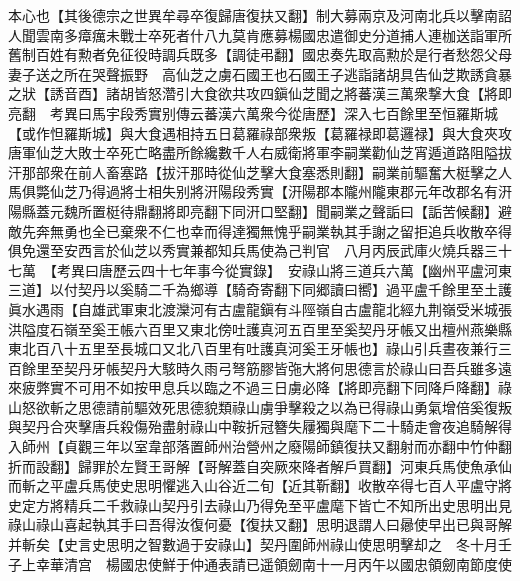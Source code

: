 本心也【其後德宗之世異牟尋卒復歸唐復扶又翻】制大募兩京及河南北兵以擊南詔人聞雲南多瘴癘未戰士卒死者什八九莫肯應募楊國忠遣御史分道捕人連枷送詣軍所舊制百姓有勲者免征役時調兵既多【調徒弔翻】國忠奏先取高勲於是行者愁怨父母妻子送之所在哭聲振野　高仙芝之虜石國王也石國王子逃詣諸胡具告仙芝欺誘貪暴之狀【誘音酉】諸胡皆怒濳引大食欲共攻四鎭仙芝聞之將蕃漢三萬衆撃大食【將即亮翻　考異曰馬宇段秀實别傳云蕃漢六萬衆今從唐歷】深入七百餘里至恒羅斯城【或作怛羅斯城】與大食遇相持五日葛羅祿部衆叛【葛羅禄即葛邏禄】與大食夾攻唐軍仙芝大敗士卒死亡略盡所餘纔數千人右威衛將軍李嗣業勸仙芝宵遁道路阻隘拔汗那部衆在前人畜塞路【拔汗那時從仙芝擊大食塞悉則翻】嗣業前驅奮大梃擊之人馬俱斃仙芝乃得過將士相失别將汧陽段秀實【汧陽郡本隴州隴東郡元年改郡名有汧陽縣蓋元魏所置梃待鼎翻將即亮翻下同汧口堅翻】聞嗣業之聲詬曰【詬苦候翻】避敵先奔無勇也全已棄衆不仁也幸而得達獨無愧乎嗣業執其手謝之留拒追兵收散卒得俱免還至安西言於仙芝以秀實兼都知兵馬使為己判官　八月丙辰武庫火燒兵器三十七萬　【考異曰唐歷云四十七年事今從實錄】　安祿山將三道兵六萬【幽州平盧河東三道】以付契丹以奚騎二千為鄉導【騎奇寄翻下同郷讀曰嚮】過平盧千餘里至土護眞水遇雨【自雄武軍東北渡灤河有古盧龍鎭有斗陘嶺自古盧龍北經九荆嶺受米城張洪隘度石嶺至奚王帳六百里又東北傍吐護真河五百里至奚契丹牙帳又出檀州燕樂縣東北百八十五里至長城口又北八百里有吐護真河奚王牙帳也】祿山引兵晝夜兼行三百餘里至契丹牙帳契丹大駭時久雨弓弩筋膠皆㢮大將何思德言於祿山曰吾兵雖多遠來疲弊實不可用不如按甲息兵以臨之不過三日虜必降【將即亮翻下同降戶降翻】祿山怒欲斬之思德請前驅效死思德貌類祿山虜爭擊殺之以為已得祿山勇氣增倍奚復叛與契丹合夾擊唐兵殺傷殆盡射祿山中鞍折冠簪失屨獨與麾下二十騎走會夜追騎解得入師州【貞觀三年以室韋部落置師州治營州之廢陽師鎮復扶又翻射而亦翻中竹仲翻折而設翻】歸罪於左賢王哥解【哥解蓋自突厥來降者解戶買翻】河東兵馬使魚承仙而斬之平盧兵馬使史思明懼逃入山谷近二旬【近其靳翻】收散卒得七百人平盧守將史定方將精兵二千救祿山契丹引去祿山乃得免至平盧麾下皆亡不知所出史思明出見祿山祿山喜起執其手曰吾得汝復何憂【復扶又翻】思明退謂人曰曏使早出已與哥解并斬矣【史言史思明之智數過于安祿山】契丹圍師州祿山使思明擊却之　冬十月壬子上幸華清宫　楊國忠使鮮于仲通表請已遥領劒南十一月丙午以國忠領劒南節度使

